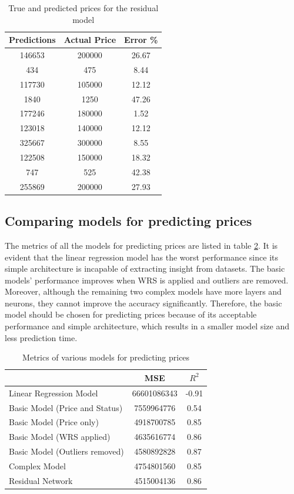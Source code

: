 \documentclass[12pt,twoside]{report}
\begin{document}
\begin{table}[!htbp]
	\centering
	\caption{ True and predicted prices for the residual model}
	\label{resnet_prediction_price}
	\begin{tabular}{| c | c | c |}
		\hline
		Predictions & Actual Price & Error \% \\
		\hline
		146653 & 200000 & 26.67 \\
		\hline
		434 & 475 & 8.44 \\
		\hline
		117730 & 105000 & 12.12 \\
		\hline
		1840 & 1250 & 47.26 \\
		\hline
		177246 & 180000 & 1.52 \\
		\hline
		123018 & 140000 & 12.12 \\
		\hline
		325667 & 300000 & 8.55 \\ 
		\hline
		122508 & 150000 & 18.32 \\
		\hline
		747 & 525 & 42.38 \\
		\hline
		255869 & 200000 & 27.93 \\
		\hline
	\end{tabular}
\end{table}

\subsection{Comparing models for predicting prices}
The metrics of all the models for predicting prices are listed in table \ref{metrics_basic_model}. It is evident that the linear regression model has the worst performance since its simple architecture is incapable of extracting insight from datasets. The basic models' performance improves when WRS is applied and outliers are removed. Moreover, although the remaining two complex models have more layers and neurons, they cannot improve the accuracy significantly. Therefore, the basic model should be chosen for predicting prices because of its acceptable performance and simple architecture, which results in a smaller model size and less prediction time. 
\begin{table}[!htbp]
	\centering
	\caption{Metrics of various models for predicting prices}
	\label{metrics_basic_model}
	\begin{tabular}{| l | c | c |}
		\hline
		& MSE & $R^2$ \\
		\hline
		Linear Regression Model & 66601086343 & -0.91 \\
		\hline
		Basic Model (Price and Status) & 7559964776 & 0.54 \\
		\hline
		Basic Model (Price only) & 4918700785 & 0.85 \\
		\hline
		Basic Model (WRS applied) & 4635616774 & 0.86 \\
		\hline
		Basic Model (Outliers removed) & 4580892828 & 0.87 \\
		\hline
		Complex Model & 4754801560 & 0.85 \\
		\hline
		Residual Network & 4515004136 & 0.86 \\
		\hline
	\end{tabular}
\end{table}
\end{document}
